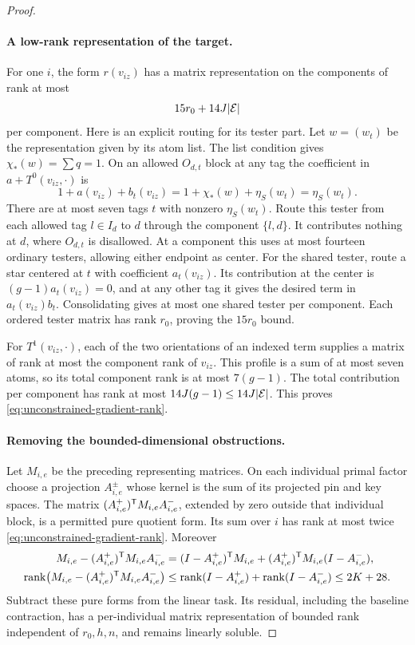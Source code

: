 \begin{proof}
\paragraph{A low-rank representation of the target.}
For one $i$, the form $r(v_{iz})$ has a matrix representation
on the components of rank at most
\begin{equation}\label{eq:unconstrained-gradient-rank}
 15r_0+14J|\mathcal E|
\end{equation}
per component.  Here is an explicit routing for its tester
part.  Let $w=(w_t)$ be the representation given by its atom
list.  The list condition gives $\chi_*(w)=\sum q=1$.
On an allowed $O_{d,t}$ block at any tag the coefficient in
$a+T^0(v_{iz},\cdot)$ is
\[
 1+a(v_{iz})+b_t(v_{iz})
 =1+\chi_*(w)+\eta_S(w_t)=\eta_S(w_t).
\]
There are at most seven tags $t$ with nonzero $\eta_S(w_t)$.
Route this tester from each allowed tag $l\in I_d$ to $d$
through the component $\{l,d\}$.  It contributes nothing at
$d$, where $O_{d,t}$ is disallowed.  At a component this uses
at most fourteen ordinary testers, allowing either endpoint
as center.  For the shared tester, route a star centered at
$t$ with coefficient $a_t(v_{iz})$.  Its contribution at the
center is $(g-1)a_t(v_{iz})=0$, and at any other tag it gives
the desired term in $a_t(v_{iz})b_t$.  Consolidating gives at
most one shared tester per component.  Each ordered tester
matrix has rank $r_0$, proving the $15r_0$ bound.

For $T^1(v_{iz},\cdot)$, each of the two orientations of an
indexed term supplies a matrix of rank at most the component
rank of $v_{iz}$.  This profile is a sum of at most seven
atoms, so its total component rank is at most $7(g-1)$.
The total contribution per component has rank at most
$14J(g-1)\le14J|\mathcal E|$.  This proves
\eqref{eq:unconstrained-gradient-rank}.

\paragraph{Removing the bounded-dimensional obstructions.}
Let $M_{i,e}$ be the preceding representing matrices.  On each
individual primal factor choose a projection $A_{i,e}^{\pm}$
whose kernel is the sum of its projected pin and key spaces.
The matrix
$(A_{i,e}^+)^{\mathsf T} M_{i,e}A_{i,e}^-$, extended by zero outside
that individual block, is a permitted pure quotient form.
Its sum over $i$ has rank at most twice
\eqref{eq:unconstrained-gradient-rank}.  Moreover
\begin{align}\label{eq:bounded-rank-removal}
 M_{i,e}-(A_{i,e}^+)^{\mathsf T} M_{i,e}A_{i,e}^-
 &= (I-A_{i,e}^+)^{\mathsf T} M_{i,e}
       +(A_{i,e}^+)^{\mathsf T} M_{i,e}(I-A_{i,e}^-),\\
 \operatorname{rank}\bigl(M_{i,e}-(A_{i,e}^+)^{\mathsf T} M_{i,e}A_{i,e}^-\bigr)
 &\le \operatorname{rank}(I-A_{i,e}^+)+\operatorname{rank}(I-A_{i,e}^-)
 \le 2K+28.\notag
\end{align}
Subtract these pure forms from the linear task.  Its residual,
including the baseline contraction, has a per-individual
matrix representation of bounded rank independent of
$r_0,h,n$, and remains linearly soluble.


\end{proof}
